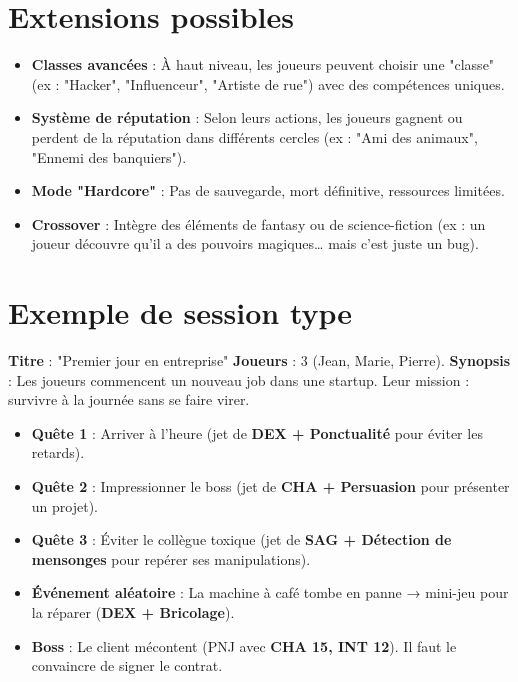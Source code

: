 \documentclass[11pt, a4paper]{article}
\begin{document}
\section{Extensions possibles}
\begin{itemize}
    \item \textbf{Classes avancées} : À haut niveau, les joueurs peuvent choisir une "classe" (ex : "Hacker", "Influenceur", "Artiste de rue") avec des compétences uniques.
    \item \textbf{Système de réputation} : Selon leurs actions, les joueurs gagnent ou perdent de la réputation dans différents cercles (ex : "Ami des animaux", "Ennemi des banquiers").
    \item \textbf{Mode "Hardcore"} : Pas de sauvegarde, mort définitive, ressources limitées.
    \item \textbf{Crossover} : Intègre des éléments de fantasy ou de science-fiction (ex : un joueur découvre qu'il a des pouvoirs magiques… mais c'est juste un bug).
\end{itemize}

\section{Exemple de session type}
\textbf{Titre} : "Premier jour en entreprise" 
\textbf{Joueurs} : 3 (Jean, Marie, Pierre). 
\textbf{Synopsis} : Les joueurs commencent un nouveau job dans une startup. Leur mission : survivre à la journée sans se faire virer.

\begin{itemize}
    \item \textbf{Quête 1} : Arriver à l'heure (jet de \textbf{DEX + Ponctualité} pour éviter les retards).
    \item \textbf{Quête 2} : Impressionner le boss (jet de \textbf{CHA + Persuasion} pour présenter un projet).
    \item \textbf{Quête 3} : Éviter le collègue toxique (jet de \textbf{SAG + Détection de mensonges} pour repérer ses manipulations).
    \item \textbf{Événement aléatoire} : La machine à café tombe en panne → mini-jeu pour la réparer (\textbf{DEX + Bricolage}).
    \item \textbf{Boss} : Le client mécontent (PNJ avec \textbf{CHA 15, INT 12}). Il faut le convaincre de signer le contrat.
\end{itemize}
\end{document}
